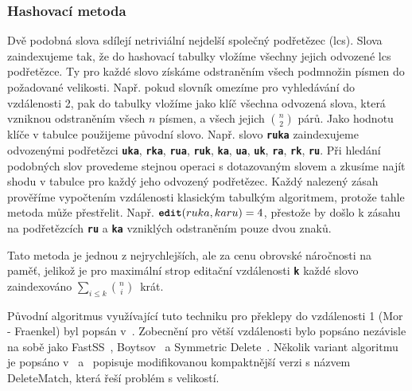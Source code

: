 \documentclass[11pt,letterpaper,oneside,openright]{book}
\newcommand{\bftt}[1]{\texttt{\textbf{#1}}}
\begin{document}
\subsubsection{Hashovací metoda} \label{sec:hash_fuzzy}
Dvě podobná slova sdílejí netriviální nejdelší společný podřetězec (lcs). Slova
zaindexujeme tak, že do hashovací tabulky vložíme všechny jejich odvozené lcs
podřetězce. Ty pro každé slovo získáme odstraněním všech podmnožin písmen do
požadované velikosti. Např. pokud slovník omezíme pro vyhledávání do
vzdálenosti 2, pak do tabulky vložíme jako klíč všechna odvozená slova, která
vzniknou odstraněním všech $n$ písmen, a všech jejich ${n \choose 2}$ párů. Jako
hodnotu klíče v tabulce použijeme původní slovo. Např. slovo \bftt{ruka}
zaindexujeme odvozenými podřetězci \bftt{uka}, \bftt{rka}, \bftt{rua},
\bftt{ruk}, \bftt{ka}, \bftt{ua}, \bftt{uk}, \bftt{ra}, \bftt{rk}, \bftt{ru}.
Při hledání podobných slov provedeme stejnou operaci s dotazovaným slovem a
zkusíme najít shodu v tabulce pro každý jeho odvozený podřetězec. Každý
nalezený zásah prověříme vypočtením vzdálenosti klasickým tabulkým algoritmem,
protože tahle metoda může přestřelit. Např. $\bftt{edit}(ruka, karu) = 4$,
přestože by došlo k zásahu na podřetězcích \bftt{ru} a \bftt{ka} vzniklých
odstraněním pouze dvou znaků.

Tato metoda je jednou z nejrychlejších, ale za cenu obrovské náročnosti na
paměť, jelikož je pro maximální strop editační vzdálenosti \bftt{k} každé slovo
zaindexováno $\sum_{i \leq k} {n \choose i}$~krát.

Původní algoritmus  využívající tuto techniku pro překlepy do vzdálenosti 1
(Mor - Fraenkel) byl popsán v~\cite{Mor:1982:HCM:358728.358752}. Zobecnění pro
větší vzdálenosti bylo popsáno nezávisle na sobě jako FastSS~\cite{FastSS},
Boytsov~\cite{Boytsov:2011:IMA:1963190.1963191} a Symmetric
Delete~\cite{Faroo_symmetric_delete}. Několik variant algoritmu je popsáno
v~\cite{FastSS} a~\cite{Bast:2013:EFS:2457465.2457470} popisuje modifikovanou
kompaktnější verzi s názvem DeleteMatch, která řeší problém s velikostí.
\end{document}
